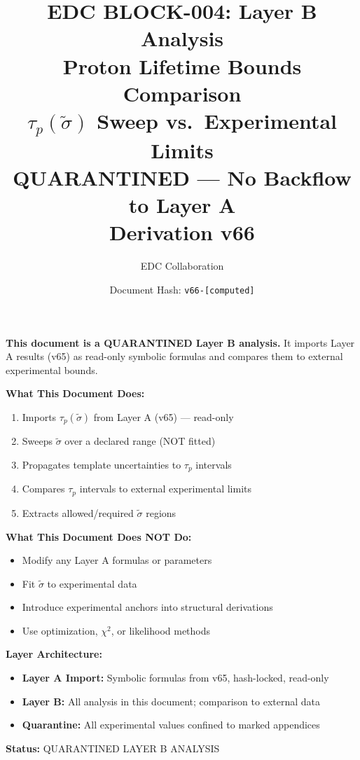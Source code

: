 \documentclass[11pt,a4paper]{article}
\theoremstyle{definition}
\begin{document}

\title{%
  \textbf{EDC BLOCK-004: Layer B Analysis}\\[0.5em]
  \Large Proton Lifetime Bounds Comparison\\[0.3em]
  \large $\tau_p(\tilde{\sigma})$ Sweep vs.\ Experimental Limits\\[0.3em]
  \normalsize QUARANTINED --- No Backflow to Layer A\\[0.2em]
  \small Derivation v66
}

\author{EDC Collaboration}
\date{Document Hash: \texttt{v66-[computed]}}

\maketitle

\begin{readercontract}
\textbf{This document is a QUARANTINED Layer B analysis.}
It imports Layer A results (v65) as read-only symbolic formulas and compares
them to external experimental bounds.

\textbf{What This Document Does:}
\begin{enumerate}
  \item Imports $\tau_p(\tilde{\sigma})$ from Layer A (v65) --- read-only
  \item Sweeps $\tilde{\sigma}$ over a declared range (NOT fitted)
  \item Propagates template uncertainties to $\tau_p$ intervals
  \item Compares $\tau_p$ intervals to external experimental limits
  \item Extracts allowed/required $\tilde{\sigma}$ regions
\end{enumerate}

\textbf{What This Document Does NOT Do:}
\begin{itemize}
  \item Modify any Layer A formulas or parameters
  \item Fit $\tilde{\sigma}$ to experimental data
  \item Introduce experimental anchors into structural derivations
  \item Use optimization, $\chi^2$, or likelihood methods
\end{itemize}

\textbf{Layer Architecture:}
\begin{itemize}
  \item \textbf{Layer A Import:} Symbolic formulas from v65, hash-locked, read-only
  \item \textbf{Layer B:} All analysis in this document; comparison to external data
  \item \textbf{Quarantine:} All experimental values confined to marked appendices
\end{itemize}

\textbf{Status:} QUARANTINED LAYER B ANALYSIS
\end{readercontract}
\end{document}

